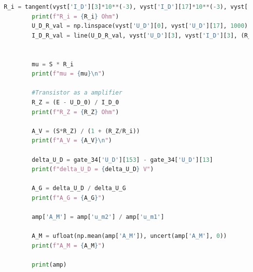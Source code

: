 \documentclass[a4paper,11pt]{article}
\begin{document}
\begin{lstlisting}[language=Python, basicstyle=\tiny, breaklines=true, postbreak=\mbox{\textbackslashspace}]
        R_i = tangent(vyst['I_D'][3]*10**(-3), vyst['I_D'][17]*10**(-3), vyst['U_D'][3], vyst['U_D'][17])**(-1)
        print(f"R_i = {R_i} Ohm")
        U_D_R_val = np.linspace(vyst['U_D'][0], vyst['U_D'][17], 1000)
        I_D_R_val = line(U_D_R_val, vyst['U_D'][3], vyst['I_D'][3], (R_i*10**(-3))**(-1))


        mu = S * R_i
        print(f"mu = {mu}\n")

        #Transistor as a amplifier
        R_Z = (E - U_D_0) / I_D_0 
        print(f"R_Z = {R_Z} Ohm")

        A_V = (S*R_Z) / (1 + (R_Z/R_i))
        print(f"A_V = {A_V}\n")

        delta_U_D = gate_34['U_D'][153] - gate_34['U_D'][13]
        print(f"delta_U_D = {delta_U_D} V")

        A_G = delta_U_D / delta_U_G
        print(f"A_G = {A_G}")

        amp['A_M'] = amp['u_m2'] / amp['u_m1']

        A_M = ufloat(np.mean(amp['A_M']), uncert(amp['A_M'], 0))
        print(f"A_M = {A_M}")

        print(amp)
    \end{lstlisting}
\end{document}
